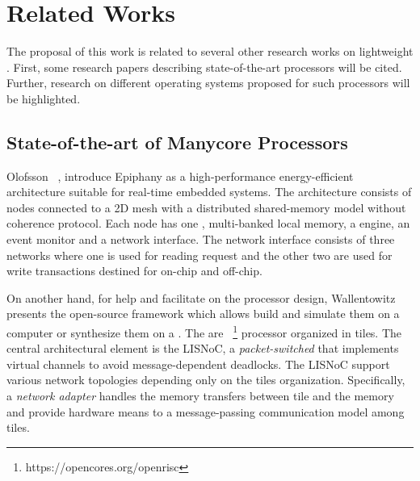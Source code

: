 \chapter{Related Works}
\label{ch.related-works}

The proposal of this work is related to several other research works
on lightweight \manycores.
First, some research papers describing state-of-the-art \manycores
processors will be cited. Further, research on different operating
systems proposed for such processors will be highlighted.

\section{State-of-the-art of Manycore Processors}

	Olofsson \etal~\cite{olofsson2014}, introduce Epiphany as a high-performance energy-efficient \manycore
	architecture suitable for real-time embedded systems.
	The architecture consists of nodes connected to a 2D mesh \noc with a distributed shared-memory model
	without coherence protocol.
	Each node has one \risc \cpu, multi-banked local memory, a \dma engine, an event monitor and a network interface.
	The network interface consists of three networks where one is used for reading request and the other two are used
	for write transactions destined for on-chip and off-chip.


	On another hand, for help and facilitate on the \manycore processor design, Wallentowitz \etal~\cite{Wallentowitz2013}
	presents the open-source framework \optimsoc which allows build \manycore \soc and simulate them on a computer
	or synthesize them on a \fpga.
	The \pes are \openrisc~\footnote{https://opencores.org/openrisc} processor organized in tiles.
	The central architectural element is the LISNoC, a \textit{packet-switched \noc} that implements virtual channels
	to avoid message-dependent deadlocks.
	The LISNoC support various network topologies depending only on the tiles organization.
	Specifically, a \textit{network adapter} handles the memory transfers between tile and the memory and provide
	hardware means to a message-passing communication model among tiles.

